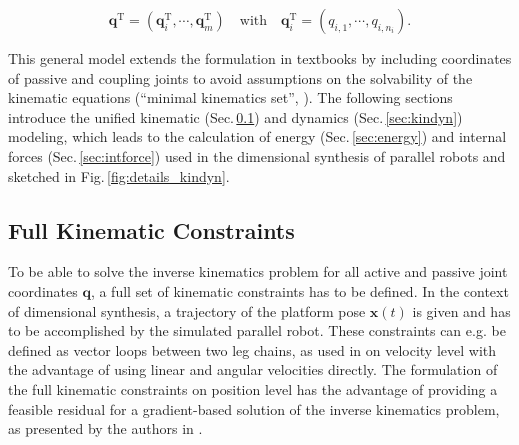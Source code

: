 \documentclass[fleqn,a4paper,10pt]{article}
\newcommand{\bm}[1]{\mathbf{#1}}
\renewcommand{\Phi}[1]{\varPhi{#1}}
\newcommand{\transp}[0]{{\mathrm{T}}}
\begin{document}
\begin{multicols}{2}
\begin{equation}
\bm{q}^\transp=(\bm{q}_{i}^\transp,\cdots,\bm{q}_{m}^\transp) \quad \mathrm{with}  \quad \bm{q}_i^\transp=(q_{i,1},\cdots,q_{i,n_i}).
\end{equation}

This general model extends the formulation in textbooks \cite{Merlet2006,BriotKha2015} by including coordinates of passive and coupling joints to avoid assumptions on the 	solvability of the kinematic equations (``minimal kinematics set'', \cite{Merlet2006}). 
The following sections introduce the unified kinematic (Sec.\,\ref{sec:kinematics}) and dynamics (Sec.\,\ref{sec:kindyn}) modeling, which leads to the calculation of energy (Sec.\,\ref{sec:energy}) and internal forces (Sec.\,\ref{sec:intforce}) used in the dimensional synthesis of parallel robots and sketched in Fig.\,\ref{fig:details_kindyn}.
\subsection{Full Kinematic Constraints}
\label{sec:kinematics}



To be able to solve the inverse kinematics problem for all active and passive joint coordinates $\bm{q}$, a full set of kinematic constraints has to be defined.
In the context of dimensional synthesis, a trajectory of the platform pose $\bm{x}(t)$ is given and has to be accomplished by the simulated parallel robot.
These constraints can e.g. be defined as vector loops between two leg chains, as used in \cite{Gogu2008} on velocity level with the advantage of using linear and angular velocities directly.
The formulation of the full kinematic constraints on position level has the advantage of providing a feasible residual for a gradient-based solution of the inverse kinematics problem, as presented by the authors in \cite{SchapplerTapOrt2019c}. 


\end{multicols}
\end{document}
